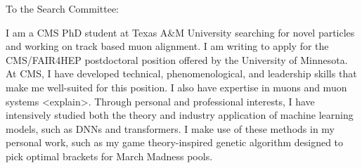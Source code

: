 \documentclass[11pt]{article}
\begin{document}




\bigskip

To the Search Committee: 

I am a CMS PhD student at Texas A\&M University searching for novel particles and working on track based muon alignment. I am writing to apply for the CMS/FAIR4HEP postdoctoral position offered by the University of Minnesota. At CMS, I have developed technical, phenomenological, and leadership skills that make me well-suited for this position. I also have expertise in muons and muon systems <explain>. Through personal and professional interests, I have intensively studied both the theory and industry application of machine learning models, such as DNNs and transformers. I make use of these methods in my personal work, such as my game theory-inspired genetic algorithm designed to pick optimal brackets for March Madness pools. 
\end{document}
